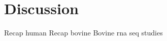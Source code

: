 

\section{Discussion} \label{sec:Discussion Chapter2}
Recap human \newline
Recap bovine \newline
Bovine rna seq studies



